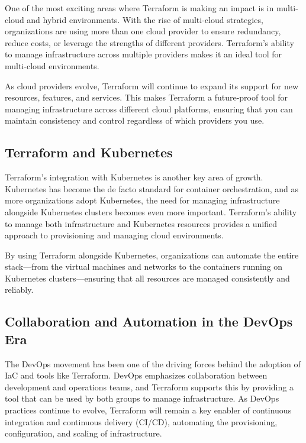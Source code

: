 One of the most exciting areas where Terraform is making an impact is in multi-cloud and hybrid environments. With the rise of multi-cloud strategies, organizations are using more than one cloud provider to ensure redundancy, reduce costs, or leverage the strengths of different providers. Terraform's ability to manage infrastructure across multiple providers makes it an ideal tool for multi-cloud environments.

As cloud providers evolve, Terraform will continue to expand its support for new resources, features, and services. This makes Terraform a future-proof tool for managing infrastructure across different cloud platforms, ensuring that you can maintain consistency and control regardless of which providers you use.

\subsection{Terraform and Kubernetes}

Terraform's integration with Kubernetes is another key area of growth. Kubernetes has become the de facto standard for container orchestration, and as more organizations adopt Kubernetes, the need for managing infrastructure alongside Kubernetes clusters becomes even more important. Terraform's ability to manage both infrastructure and Kubernetes resources provides a unified approach to provisioning and managing cloud environments.

By using Terraform alongside Kubernetes, organizations can automate the entire stack—from the virtual machines and networks to the containers running on Kubernetes clusters—ensuring that all resources are managed consistently and reliably.

\subsection{Collaboration and Automation in the DevOps Era}

The DevOps movement has been one of the driving forces behind the adoption of IaC and tools like Terraform. DevOps emphasizes collaboration between development and operations teams, and Terraform supports this by providing a tool that can be used by both groups to manage infrastructure. As DevOps practices continue to evolve, Terraform will remain a key enabler of continuous integration and continuous delivery (CI/CD), automating the provisioning, configuration, and scaling of infrastructure.

